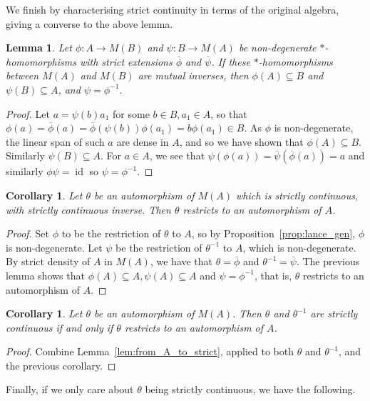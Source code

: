 \documentclass[a4paper,12pt]{article}
\theoremstyle{plain}
\newtheorem{corollary}[proposition]{Corollary}
\newtheorem{lemma}[proposition]{Lemma}
\theoremstyle{definition}
\newcommand{\id}{\operatorname{id}}
\begin{document}
We finish by characterising strict continuity in terms of the original algebra, giving a converse
to the above lemma.

\begin{lemma}
Let $\phi:A\rightarrow M(B)$ and $\psi:B\rightarrow M(A)$ be non-degenerate $*$-homomorphisms with
strict extensions $\overline\phi$ and $\overline\psi$.  If these $*$-homomorphisms between $M(A)$ and
$M(B)$ are mutual inverses, then $\phi(A)\subseteq B$ and $\psi(B)\subseteq A$, and $\psi=\phi^{-1}$.
\end{lemma}
\begin{proof}
Let $a=\psi(b)a_1$ for some $b\in B, a_1\in A$, so that $\phi(a) = \overline\phi(a)
= \overline\phi(\psi(b)) \phi(a_1) = b \phi(a_1) \in B$.  As $\phi$ is non-degenerate, the linear span
of such $a$ are dense in $A$, and so we have shown that $\phi(A) \subseteq B$.  Similarly
$\psi(B)\subseteq A$.  For $a\in A$, we see that $\psi(\phi(a)) = \overline\psi(\overline\phi(a)) = a$
and similarly $\phi\psi=\id$ so $\psi=\phi^{-1}$.
\end{proof}

\begin{corollary}
Let $\theta$ be an automorphism of $M(A)$ which is strictly continuous, with strictly
continuous inverse.  Then $\theta$ restricts to an automorphism of $A$.
\end{corollary}
\begin{proof}
Set $\phi$ to be the restriction of $\theta$ to $A$, so by Proposition~\ref{prop:lance_gen}, $\phi$
is non-degenerate.  Let $\psi$ be the restriction of $\theta^{-1}$ to $A$, which is non-degenerate.
By strict density of $A$ in $M(A)$, we have that $\theta = \overline\phi$ and $\theta^{-1} = \overline\psi$.
The previous lemma shows that $\phi(A)\subseteq A, \psi(A)\subseteq A$ and $\psi = \phi^{-1}$, that is,
$\theta$ restricts to an automorphism of $A$.
\end{proof}

\begin{corollary}
Let $\theta$ be an automorphism of $M(A)$.  Then $\theta$ and $\theta^{-1}$ are strictly continuous
if and only if $\theta$ restricts to an automorphism of $A$.
\end{corollary}
\begin{proof}
Combine Lemma~\ref{lem:from_A_to_strict}, applied to both $\theta$ and $\theta^{-1}$,
and the previous corollary.
\end{proof}

Finally, if we only care about $\theta$ being strictly continuous, we have the following.
\end{document}
